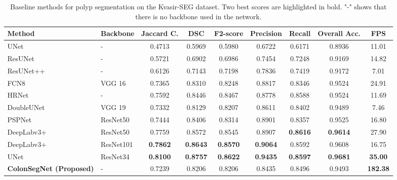 \documentclass[journal]{IEEEtran}
\begin{document}
\begin{table*}[t!]
\centering
\def\arraystretch{1.2}
\caption{Baseline methods for polyp segmentation on the Kvasir-SEG dataset. Two best scores are highlighted in bold. "-" shows that there is no backbone used in the network. }
\label{res:polypsegmentation}
\begin{tabular}{l|l|c|c|c|c|c|c|c}
\toprule
\textbf{Method} & \multicolumn{1}{c|}{\textbf{Backbone}} & \textbf{Jaccard C.} & \textbf{DSC} & \textbf{F2-score} & \textbf{Precision} & \textbf{Recall} & \textbf{Overall Acc.} & \textbf{FPS} \\ \midrule
{UNet}~\cite{ronneberger2015u} & -  & 0.4713  & 0.5969    &0.5980   &0.6722  & 0.6171  & 0.8936 & 11.01\\ \hline

ResUNet~\cite{zhang2018road} & - & 0.5721 & 0.6902 & 0.6986  & 0.7454  & 0.7248  &0.9169 & 14.82 \\ \hline

{ResUNet++}~\cite{jha2019resunet++} & -  &   0.6126 &  0.7143  &  0.7198   &   0.7836     &   0.7419   & 0.9172  & 7.01 \\ \hline
{FCN8}~\cite{long2015fully}       &    VGG 16                                    & 0.7365      & 0.8310       & 0.8248      & 0.8817       & 0.8346       & 0.9524   &  24.91   \\ \hline
HRNet~\cite{wang2020deep} & -   &0.7592    &0.8446    &0.8467     & 0.8778     &0.8588 &0.9524 &11.69  \\ \hline

{DoubleUNet}~\cite{jha2020doubleu} & VGG 19   &   0.7332  &  0.8129  & 0.8207 &  0.8611   & 0.8402  & 0.9489  &  7.46   \\ \hline

{PSPNet}~\cite{zhao2017pyramid}     &   ResNet50                                     & 0.7444      & 0.8406       & 0.8314      & 0.8901       & 0.8357       & 0.9525    &  16.80  \\ \hline
{DeepLabv3+}~\cite{chen2018encoder} & ResNet50 &0.7759  &0.8572       & 0.8545 & 0.8907       & \textbf{0.8616}       & \textbf{0.9614} & 27.90    \\ \hline
{DeepLabv3+}~\cite{chen2018encoder} & ResNet101  & \textbf{0.7862}      & \textbf{0.8643}   & \textbf{0.8570}      & \textbf{0.9064}       & 0.8592       & 0.9608   &  16.75      \\ \hline

UNet~\cite{ronneberger2015u} & ResNet34 &\textbf{0.8100}  &\textbf{0.8757} &\textbf{0.8622 } & \textbf{0.9435} & \textbf{0.8597} & \textbf{0.9681 }&\textbf{35.00} \\ \hline

\textbf{ColonSegNet (Proposed)} &-  &0.7239  &0.8206 &0.8206  &0.8435  &0.8496 &0.9493  &{\textbf{182.38}} \\

\bottomrule 
\end{tabular}
\end{table*}
\end{document}
